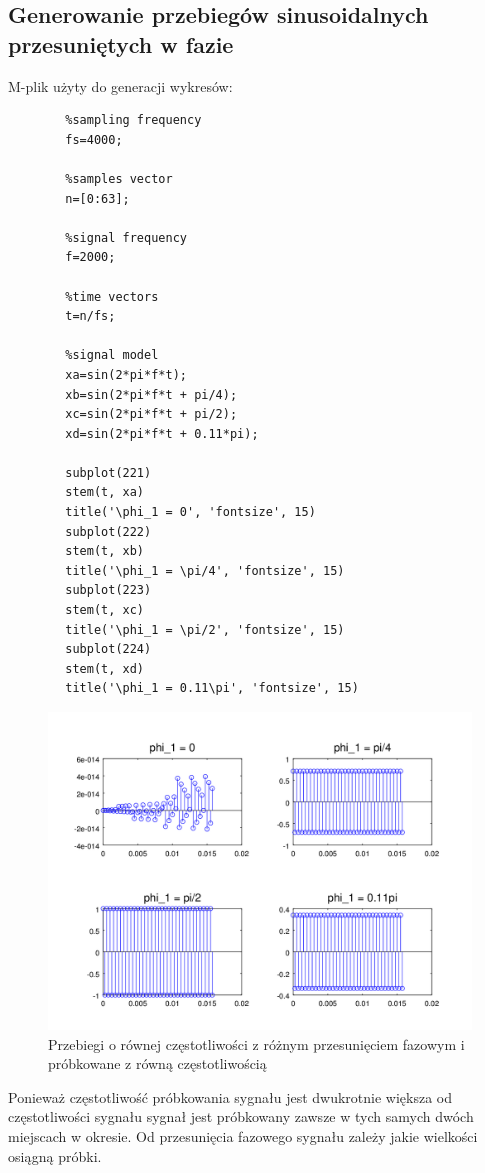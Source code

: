 \documentclass[12pt,titlepage]{report}
\begin{document}
\subsection{Generowanie przebiegów sinusoidalnych przesuniętych w fazie}
M-plik użyty do generacji wykresów:
\begin{multicols}{3}
	{
		\tiny
		\begin{verbatim}
		%sampling frequency
		fs=4000;
		
		%samples vector
		n=[0:63];
		
		%signal frequency
		f=2000;
		
		%time vectors
		t=n/fs;
		
		%signal model
		xa=sin(2*pi*f*t);
		xb=sin(2*pi*f*t + pi/4);
		xc=sin(2*pi*f*t + pi/2);
		xd=sin(2*pi*f*t + 0.11*pi);
		
		subplot(221)
		stem(t, xa)
		title('\phi_1 = 0', 'fontsize', 15)
		subplot(222)
		stem(t, xb)
		title('\phi_1 = \pi/4', 'fontsize', 15)
		subplot(223)
		stem(t, xc)
		title('\phi_1 = \pi/2', 'fontsize', 15)
		subplot(224)
		stem(t, xd)
		title('\phi_1 = 0.11\pi', 'fontsize', 15)
		\end{verbatim}
	}
\end{multicols}
\begin{figure}[!h]
	\centering
	\includegraphics[scale=0.7]{../cw13_output}
	\caption{Przebiegi o równej częstotliwości z różnym przesunięciem fazowym i próbkowane z równą częstotliwością}
\end{figure}
Ponieważ częstotliwość próbkowania sygnału jest dwukrotnie większa od częstotliwości sygnału sygnał jest próbkowany zawsze w tych samych dwóch miejscach w okresie. Od przesunięcia fazowego sygnału zależy jakie wielkości osiągną próbki.
\newpage
\end{document}
